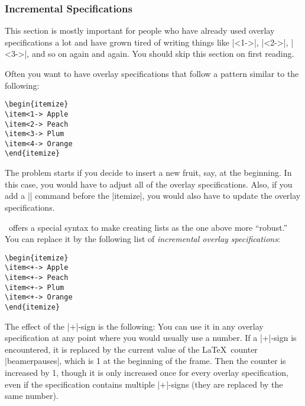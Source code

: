 \begin{original...}
\subsubsection{Incremental Specifications}
\label{section-incremental}

This section is mostly important for people who have already used overlay specifications a lot and have grown tired of writing things like |<1->|, |<2->|, |<3->|, and so on again and again. You should skip this section on first reading.

Often you want to have overlay specifications that follow a pattern similar to the following:
\begin{verbatim}
\begin{itemize}
\item<1-> Apple
\item<2-> Peach
\item<3-> Plum
\item<4-> Orange
\end{itemize}
\end{verbatim}

The problem starts if you decide to insert a new fruit, say, at the beginning. In this case, you would have to adjust all of the overlay specifications. Also, if you add a |\pause| command before the |itemize|, you would also have to update the overlay specifications.

\beamer\ offers a special syntax to make creating lists as the one above more ``robust.'' You can replace it by the following list of \emph{incremental overlay specifications}:
\begin{verbatim}
\begin{itemize}
\item<+-> Apple
\item<+-> Peach
\item<+-> Plum
\item<+-> Orange
\end{itemize}
\end{verbatim}

The effect of the |+|-sign is the following: You can use it in any overlay specification at any point where you would usually use a number. If a |+|-sign is encountered, it is replaced by the current value of the \LaTeX\ counter |beamerpauses|, which is 1 at the beginning of the frame. Then the counter is increased by 1, though it is only increased once for every overlay specification, even if the specification contains multiple |+|-signs (they are replaced by the same number).


\end{original...}
